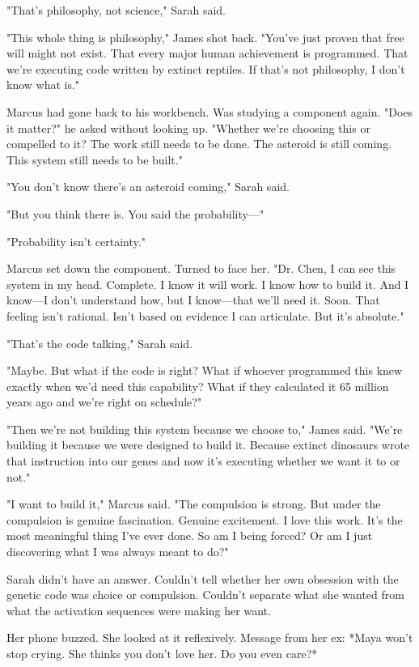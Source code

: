 "That's philosophy, not science," Sarah said.

"This whole thing is philosophy," James shot back. "You've just proven that free will might not exist. That every major human achievement is programmed. That we're executing code written by extinct reptiles. If that's not philosophy, I don't know what is."

Marcus had gone back to his workbench. Was studying a component again. "Does it matter?" he asked without looking up. "Whether we're choosing this or compelled to it? The work still needs to be done. The asteroid is still coming. This system still needs to be built."

"You don't know there's an asteroid coming," Sarah said.

"But you think there is. You said the probability—"

"Probability isn't certainty."

Marcus set down the component. Turned to face her. "Dr. Chen, I can see this system in my head. Complete. I know it will work. I know how to build it. And I know—I don't understand how, but I know—that we'll need it. Soon. That feeling isn't rational. Isn't based on evidence I can articulate. But it's absolute."

"That's the code talking," Sarah said.

"Maybe. But what if the code is right? What if whoever programmed this knew exactly when we'd need this capability? What if they calculated it 65 million years ago and we're right on schedule?"

"Then we're not building this system because we choose to," James said. "We're building it because we were designed to build it. Because extinct dinosaurs wrote that instruction into our genes and now it's executing whether we want it to or not."

"I want to build it," Marcus said. "The compulsion is strong. But under the compulsion is genuine fascination. Genuine excitement. I love this work. It's the most meaningful thing I've ever done. So am I being forced? Or am I just discovering what I was always meant to do?"

Sarah didn't have an answer. Couldn't tell whether her own obsession with the genetic code was choice or compulsion. Couldn't separate what she wanted from what the activation sequences were making her want.

Her phone buzzed. She looked at it reflexively. Message from her ex: *Maya won't stop crying. She thinks you don't love her. Do you even care?*

